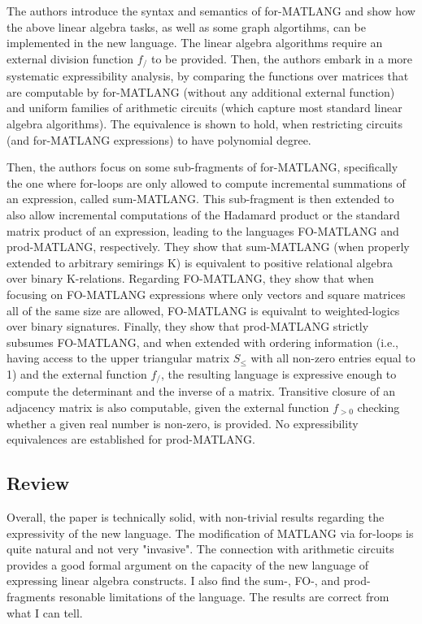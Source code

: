 \documentclass[a4paper]{article}
\begin{document}
The authors introduce the syntax and semantics of for-MATLANG and show how the above linear algebra tasks, 
as well as some graph algortihms, can be implemented in the new language.
The linear algebra algorithms require an external division function $f_/$ to be provided.
Then, the authors embark in a more systematic expressibility analysis, by comparing the functions over matrices that are 
computable by for-MATLANG (without any additional external function) and uniform families of arithmetic circuits (which 
capture most standard linear algebra algorithms).
The equivalence is shown to hold, when restricting circuits (and for-MATLANG expressions) to have polynomial degree.

Then, the authors focus on some sub-fragments of for-MATLANG, specifically the one where for-loops are only allowed to compute 
incremental summations of an expression, called sum-MATLANG. This sub-fragment is then extended to also allow incremental 
computations of the Hadamard product or the standard matrix product of an expression, leading to the languages FO-MATLANG and 
prod-MATLANG, respectively.
They show that sum-MATLANG (when properly extended to arbitrary semirings K) is equivalent to positive relational algebra over 
binary K-relations.
Regarding FO-MATLANG, they show that when focusing on FO-MATLANG expressions where only vectors and square matrices all of the 
same size are allowed, FO-MATLANG is equivalnt to weighted-logics over binary signatures.
Finally, they show that prod-MATLANG strictly subsumes FO-MATLANG, and when extended with ordering information (i.e., having 
access to the upper triangular matrix $S_\leq$ with all non-zero entries equal to 1) and the external function $f_/$, the resulting language is expressive enough to compute the determinant and the inverse of a matrix. Transitive closure of an adjacency matrix is also computable, given the external function $f_{>0}$ checking whether a given real number is non-zero, is provided.
No expressibility equivalences are established for prod-MATLANG.

\subsection*{Review}

Overall, the paper is technically solid, with non-trivial results regarding the expressivity of the new language.
The modification of MATLANG via for-loops is quite natural and not very "invasive". The connection with arithmetic circuits 
provides a good formal argument on the capacity of the new language of expressing linear algebra constructs.
I also find the sum-, FO-, and prod- fragments resonable limitations of the language. The results are correct from what I can tell.
\end{document}

